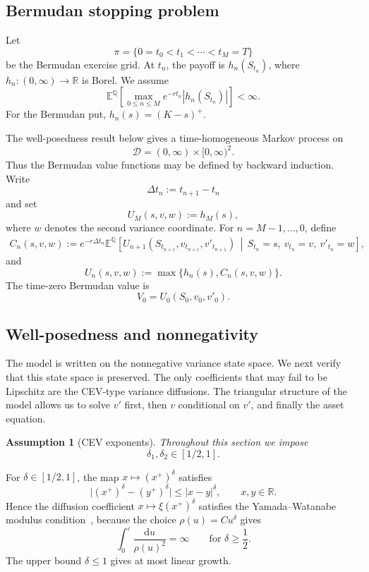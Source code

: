 \documentclass[pdflatex,sn-mathphys-num]{sn-jnl}
\theoremstyle{thmstyleone}%
\theoremstyle{thmstylethree}%
\newtheorem{assumption}[theorem]{Assumption}
\theoremstyle{thmstyletwo}%
\newcommand{\dd}{\mathrm d}
\newcommand{\E}{\mathbb E}
\newcommand{\Q}{\mathbb Q}
\newcommand{\R}{\mathbb R}
\begin{document}
\subsection{Bermudan stopping problem}

Let
$$
\pi=\{0=t_0<t_1<\cdots<t_M=T\}
$$
be the Bermudan exercise grid. At $t_n$, the payoff is $h_n(S_{t_n})$,
where $h_n:(0,\infty)\to\R$ is Borel. We assume
$$
\E^\Q\!\left[
\max_{0\le n\le M}e^{-rt_n}|h_n(S_{t_n})|
\right]<\infty .
$$
For the Bermudan put, $h_n(s)=(K-s)^+$.

The well-posedness result below gives a time-homogeneous Markov process on
$$
\mathcal D=(0,\infty)\times[0,\infty)^2 .
$$
Thus the Bermudan value functions may be defined by backward induction. Write
$$
\Delta t_n:=t_{n+1}-t_n
$$
and set
$$
U_M(s,v,w):=h_M(s),
$$
where $w$ denotes the second variance coordinate. For $n=M-1,\ldots,0$,
define
$$
\begin{aligned}
C_n(s,v,w)
:=
e^{-r\Delta t_n}
\E^\Q\!\left[
U_{n+1}(S_{t_{n+1}},v_{t_{n+1}},v'_{t_{n+1}})
\,\middle|\,
S_{t_n}=s,\ v_{t_n}=v,\ v'_{t_n}=w
\right],
\end{aligned}
$$
and
$$
U_n(s,v,w):=\max\{h_n(s),C_n(s,v,w)\}.
$$
The time-zero Bermudan value is
$$
V_0=U_0(S_0,v_0,v'_0).
$$




\subsection{Well-posedness and nonnegativity}\label{sec:wellposed}

The model is written on the nonnegative variance state space. We next verify
that this state space is preserved. The only coefficients that may fail to be
Lipschitz are the CEV-type variance diffusions. The triangular structure of the
model allows us to
solve $v'$ first, then $v$ conditional on $v'$, and finally the asset equation.

\begin{assumption}[CEV exponents]\label{ass:delta-range}
Throughout this section we impose
$$
\delta_1,\delta_2\in[1/2,1].
$$
\end{assumption}

For $\delta\in[1/2,1]$, the map $x\mapsto (x^+)^\delta$ satisfies
$$
\bigl|(x^+)^\delta-(y^+)^\delta\bigr|
\le |x-y|^\delta,\qquad x,y\in\R.
$$
Hence the diffusion coefficient $x\mapsto \xi(x^+)^\delta$ satisfies the
Yamada--Watanabe modulus condition~\cite{yamada1971uniqueness}, because the choice $\rho(u)=C u^\delta$
gives
$$
\int_0^\varepsilon \frac{\dd u}{\rho(u)^2}
=\infty
\qquad\text{for }\delta\ge \frac12.
$$
The upper bound $\delta\le1$ gives at most linear growth.
\end{document}

